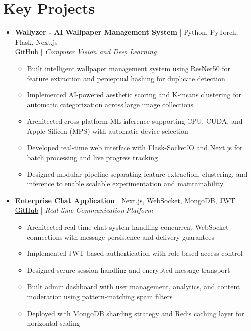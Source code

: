 \documentclass[11pt,a4paper]{article}
\newcommand{\resumeItem}[1]{
  \item\small{#1 \vspace{-1pt}}
}
\begin{document}
\section{Key Projects}
\begin{itemize}[leftmargin=*]

\item \textbf{Wallyzer - AI Wallpaper Management System} | Python, PyTorch, Flask, Next.js \\
\href{https://github.com/Dhairya3391/wallyzer}{GitHub} | \textit{Computer Vision and Deep Learning}
\begin{itemize}[leftmargin=*]
\resumeItem{Built intelligent wallpaper management system using ResNet50 for feature extraction and perceptual hashing for duplicate detection}
\resumeItem{Implemented AI-powered aesthetic scoring and K-means clustering for automatic categorization across large image collections}
\resumeItem{Architected cross-platform ML inference supporting CPU, CUDA, and Apple Silicon (MPS) with automatic device selection}
\resumeItem{Developed real-time web interface with Flask-SocketIO and Next.js for batch processing and live progress tracking}
\resumeItem{Designed modular pipeline separating feature extraction, clustering, and inference to enable scalable experimentation and maintainability}
\end{itemize}

\item \textbf{Enterprise Chat Application} | Next.js, WebSocket, MongoDB, JWT \\
\href{https://github.com/Dhairya3391/chat-app-next}{GitHub} | \textit{Real-time Communication Platform}
\begin{itemize}[leftmargin=*]
\resumeItem{Architected real-time chat system handling concurrent WebSocket connections with message persistence and delivery guarantees}
\resumeItem{Implemented JWT-based authentication with role-based access control}
\resumeItem{Designed secure session handling and encrypted message transport}
\resumeItem{Built admin dashboard with user management, analytics, and content moderation using pattern-matching spam filters}
\resumeItem{Deployed with MongoDB sharding strategy and Redis caching layer for horizontal scaling}
\end{itemize}

\end{itemize}
\end{document}
